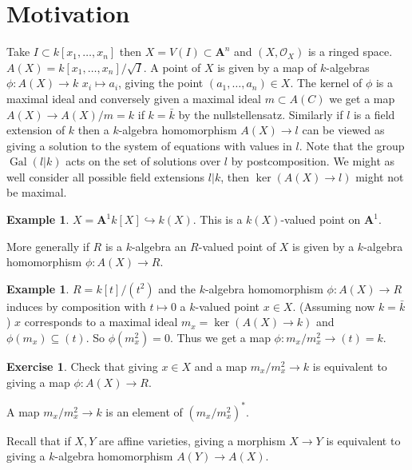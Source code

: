 \documentclass[10pt,]{book}
\theoremstyle{plain}
\theoremstyle{definition}
\newtheorem{example}[theorem]{Example}
\newtheorem{exercise}[theorem]{Exercise}
\numberwithin{equation}{section}
\newcommand{\aff}{\mathbf{A}}
\newcommand{\sO}{\mathcal{O}}
\DeclareMathOperator{\Gal}{Gal}
\begin{document}
\section[Motivation]{Motivation}\label{sec-motivation}
Take \(I \subset k[x_1,\ldots,x_n]\) then \(X = V(I) \subset \aff^n\) and \((X,\sO_X)\) is a ringed space.
          \(A(X) = k[x_1,\ldots,x_n]/\sqrt{I}\).
          A point of \(X\) is given by a map of \(k\)-algebras \(\phi\colon A(X) \to k\) \(x_i\mapsto a_i\), giving the point \((a_1,\ldots,a_n)\in X\).
          The kernel of \(\phi\) is a maximal ideal and conversely given a maximal ideal \(m\subset A(C)\) we get a map \(A(X) \to A(X)/m  = k\) if \(k = \bar{k}\) by the nullstellensatz.
          Similarly if \(l\) is a field extension of \(k\) then a \(k\)-algebra homomorphism \(A(X) \to l\) can be viewed as giving a solution to the system of equations with values in \(l\).
          Note that the group \(\Gal(l|k)\) acts on the set of solutions over \(l\) by postcomposition.
          We might as well consider all possible field extensions \(l|k\), then \(\ker(A(X) \to l)\) might not be maximal.
\begin{example}\label{example-1}
\(X = \aff^1\)\(k[X] \hookrightarrow k(X)\).
            This is a \(k(X)\)-valued point on \(\aff^1\).
          \end{example}
\par
More generally if \(R\) is a \(k\)-algebra an \(R\)-valued point of \(X\) is given by a \(k\)-algebra homomorphism \(\phi\colon A(X) \to R\).%
\begin{example}\label{example-2}
\(R =k[t]/(t^2)\)  and the \(k\)-algebra homomorphism \(\phi\colon A(X) \to R\) induces by composition with \(t\mapsto 0\) a \(k\)-valued point \(x\in X\). (Assuming now \(k = \bar{k}\)) \(x\) corresponds to a maximal ideal \(m_x = \ker(A(X) \to k)\) and \(\phi(m_x) \subseteq (t)\).
            So \(\phi(m_x^2) = 0\). 
            Thus we get a map \(\phi \colon m_x/m_x^2 \to (t) = k\).

            \begin{exercise}\label{exercise-1}
Check that giving \(x\in X\) and a map \(m_x/m_x^2 \to k\) is equivalent to giving a map \(\phi\colon A(X) \to R\).\end{exercise}


            A map \(m_x/m_x^2 \to k\) is an element of \((m_x/m_x^2)^*\).
          \end{example}
\par
Recall that if \(X,Y\) are affine varieties, giving a morphism \(X\to Y\) is equivalent to giving a \(k\)-algebra homomorphism \(A(Y) \to A(X)\).
\end{document}
